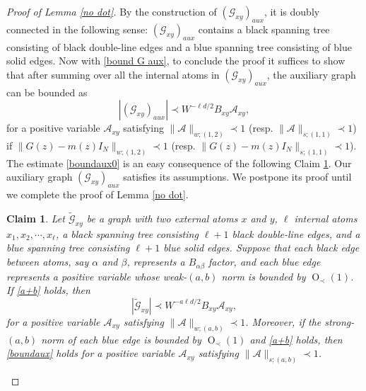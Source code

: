 \documentclass{article}
\newcommand{\1}{\mathds{1}}
\numberwithin{equation}{section}
\newcommand{\al}{\alpha}
\newcommand{\be}{\begin{equation}}
\newcommand{\ee}{\end{equation}}
\renewcommand{\cal}{\mathcal}
\newcommand{\wt}{\widetilde}
\DeclareMathOperator{\OO}{O}
\theoremstyle{plain} %
\newtheorem{claim}[theorem]{Claim}
\theoremstyle{remark}
\begin{document}
\begin{proof} [Proof of Lemma \ref{no dot}]
By the construction of $(\cal G_{xy})_{aux}$, it is doubly connected in the following sense: $(\cal G_{xy})_{aux}$ contains a black spanning tree consisting of black double-line edges and a blue spanning tree consisting of blue solid edges. Now with \eqref{bound G aux}, to conclude the proof it suffices to show that after summing over all the internal atoms in $ (\cal G_{xy})_{aux}$, the auxiliary graph can be bounded as
\be\label{boundaux0}
| (\cal G_{xy})_{aux}| \prec W^{-\ell d/2  }B_{xy}\cal A_{xy} ,
\ee
for a positive variable $\cal A_{xy}$ satisfying $\|\cal A\|_{w;(1,2)}\prec 1$ (resp. $\|\cal A\|_{s;(1,1)}\prec 1$) if $\|G(z)-m(z)I_N\|_{w;(1,2)}\prec 1$ (resp. $\|G(z)-m(z)I_N\|_{s;(1,1)}\prec 1$).
The estimate \eqref{boundaux0} is an easy consequence of the following Claim \ref{twonet claim}. Our auxiliary graph $(\cal G_{xy})_{aux}$ satisfies its assumptions. We postpone its proof until we complete the proof of Lemma \ref{no dot}.

\begin{claim}\label{twonet claim}
Let $\wt{\cal G}_{xy}$ be a graph with two external atoms $x$ and $y$, $\ell$ internal atoms $x_1, x_2,\cdots, x_\ell$, a black spanning tree consisting $\ell+1$ black double-line edges, and a blue spanning tree consisting $\ell+1$ blue solid edges. Suppose that each black edge between atoms, say $\al$ and $\beta$, represents a $B_{\al\beta}$ factor, and each blue edge represents a positive variable whose weak-$(a,b)$ norm is bounded by $\OO_\prec(1)$. If \eqref{a+b} holds, then 
\be\label{boundaux}
| \wt{\cal G}_{xy}| \prec W^{-a\ell  d /2  }B_{xy}\cal A_{xy} ,
\ee
for a positive variable $\cal A_{xy}$ satisfying $\|\cal A\|_{w;(a,b)}\prec 1$. Moreover, if the strong-$(a,b)$ norm of each blue edge is bounded by $\OO_\prec(1)$ and \eqref{a+b} holds, then \eqref{boundaux} holds for a positive variable $\cal A_{xy}$ satisfying $\|\cal A\|_{s;(a,b)}\prec 1$. 
\end{claim}



\end{proof}
\end{document}
